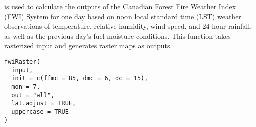 \documentclass[a4paper]{book}
\begin{document}
%
\begin{Description}\relax
{} is used to calculate the outputs of the Canadian Forest
Fire Weather Index (FWI) System for one day based on noon local standard
time (LST) weather observations of temperature, relative humidity, wind
speed, and 24-hour rainfall, as well as the previous day's fuel moisture
conditions. This function takes rasterized input and generates raster maps
as outputs.
\end{Description}
%
\begin{Usage}
\begin{verbatim}
fwiRaster(
  input,
  init = c(ffmc = 85, dmc = 6, dc = 15),
  mon = 7,
  out = "all",
  lat.adjust = TRUE,
  uppercase = TRUE
)
\end{verbatim}
\end{Usage}
%
\end{document}

